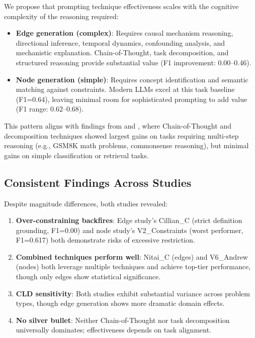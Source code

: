 We propose that prompting technique effectiveness scales with the cognitive complexity of the reasoning required:

\begin{itemize}
    \item \textbf{Edge generation (complex)}: Requires causal mechanism reasoning, directional inference, temporal dynamics, confounding analysis, and mechanistic explanation. Chain-of-Thought, task decomposition, and structured reasoning provide substantial value (F1 improvement: 0.00--0.46).
    
    \item \textbf{Node generation (simple)}: Requires concept identification and semantic matching against constraints. Modern LLMs excel at this task baseline (F1=0.64), leaving minimal room for sophisticated prompting to add value (F1 range: 0.62--0.68).
\end{itemize}

This pattern aligns with findings from \cite{wei2022chain} and \cite{zhou2022least}, where Chain-of-Thought and decomposition techniques showed largest gains on tasks requiring multi-step reasoning (e.g., GSM8K math problems, commonsense reasoning), but minimal gains on simple classification or retrieval tasks.

\subsection{Consistent Findings Across Studies}

Despite magnitude differences, both studies revealed:

\begin{enumerate}
    \item \textbf{Over-constraining backfires}: Edge study's Cillian\_C (strict definition grounding, F1=0.00) and node study's V2\_Constraints (worst performer, F1=0.617) both demonstrate risks of excessive restriction.
    
    \item \textbf{Combined techniques perform well}: Nitai\_C (edges) and V6\_Andrew (nodes) both leverage multiple techniques and achieve top-tier performance, though only edges show statistical significance.
    
    \item \textbf{CLD sensitivity}: Both studies exhibit substantial variance across problem types, though edge generation shows more dramatic domain effects.
    
    \item \textbf{No silver bullet}: Neither Chain-of-Thought nor task decomposition universally dominates; effectiveness depends on task alignment.
\end{enumerate}

